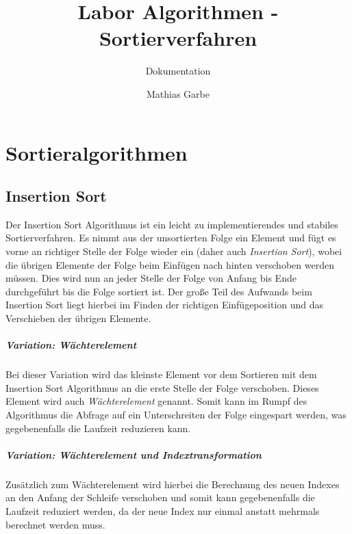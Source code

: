 \documentclass[12pt, a4paper, titlepage, hidelinks]{scrreprt}
\title{Labor Algorithmen - Sortierverfahren}
\subtitle{Dokumentation}
\author{Mathias Garbe}
\begin{document}
\maketitle

\tableofcontents
{}

\clearpage


\chapter{Sortieralgorithmen}

\section{Insertion Sort}

Der Insertion Sort Algorithmus ist ein leicht zu implementierendes und stabiles Sortierverfahren. Es nimmt aus der unsortierten Folge ein Element und fügt es vorne an richtiger Stelle der Folge wieder ein (daher auch \textit{Insertion Sort}), wobei die übrigen Elemente der Folge beim Einfügen nach hinten verschoben werden müssen. Dies wird nun an jeder Stelle der Folge von Anfang bis Ende durchgeführt bis die Folge sortiert ist. Der große Teil des Aufwands beim Insertion Sort liegt hierbei im Finden der richtigen Einfügeposition und das Verschieben der übrigen Elemente.

\paragraph{Variation: Wächterelement} Bei dieser Variation wird das kleinste Element vor dem Sortieren mit dem Insertion Sort Algorithmus an die erste Stelle der Folge verschoben. Dieses Element wird auch \textit{Wächterelement} genannt. Somit kann im Rumpf des Algorithmus die Abfrage auf ein Unterschreiten der Folge eingespart werden, was gegebenenfalls die Laufzeit reduzieren kann.

\paragraph{Variation: Wächterelement und Indextransformation} Zusätzlich zum Wächterelement wird hierbei die Berechnung des neuen Indexes an den Anfang der Schleife verschoben und somit kann gegebenenfalls die Laufzeit reduziert werden, da der neue Index nur einmal anstatt mehrmals berechnet werden muss.
\end{document}
